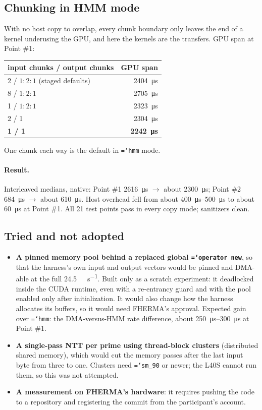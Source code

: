 \documentclass[11pt,a4paper]{article}
\newcommand{\code}[1]{\texttt{\hyphenchar\font=`\-\relax #1}}
\newcommand{\us}[1]{\SI{#1}{\micro\second}}
\begin{document}
\subsection{Chunking in HMM mode}
With no host copy to overlap, every chunk boundary only leaves the end of a kernel
underusing the GPU, and here the kernels are the transfers. GPU span at Point \#1:
\begin{center}
\begin{tabular}{lr}
\toprule
input chunks / output chunks & GPU span \\
\midrule
2 / $1{:}2{:}1$ (staged defaults) & \us{2404} \\
8 / $1{:}2{:}1$ & \us{2705} \\
1 / $1{:}2{:}1$ & \us{2323} \\
2 / 1 & \us{2304} \\
\textbf{1 / 1} & \textbf{\us{2242}} \\
\bottomrule
\end{tabular}
\end{center}
One chunk each way is the default in \code{hmm} mode.

\paragraph{Result.} Interleaved medians, native: Point \#1 \us{2616} $\to$ about \us{2300};
Point \#2 \us{684} $\to$ about \us{610}. Host overhead fell from about \us{400}--\us{500} to
about \us{60} at Point \#1. All 21 test points pass in every copy mode; sanitizers clean.

\subsection{Tried and not adopted}
\begin{itemize}[leftmargin=*]
\item \textbf{A pinned memory pool behind a replaced global \code{operator new}}, so that the
  harness's own input and output vectors would be pinned and DMA-able at the full
  \SI{24.5}{\giga\byte\per\second}. Built only as a scratch experiment: it deadlocked inside the
  CUDA runtime, even with a re-entrancy guard and with the pool enabled only after
  initialization. It would also change how the harness allocates its buffers, so it would need
  FHERMA's approval. Expected gain over \code{hmm}: the DMA-versus-HMM rate difference, about
  \us{250}--\us{300} at Point \#1.
\item \textbf{A single-pass NTT per prime using thread-block clusters} (distributed shared memory),
  which would cut the memory passes after the last input byte from three to one. Clusters need
  \code{sm\_90} or newer; the L40S cannot run them, so this was not attempted.
\item \textbf{A measurement on FHERMA's hardware}: it requires pushing the code to a repository and
  registering the commit from the participant's account.
\end{itemize}
\end{document}
